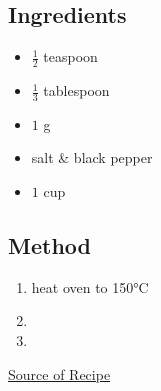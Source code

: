 \documentclass[11pt,a4paper]{article}
\begin{document}
\subsection*{Ingredients}

\begin{multicols}{2}

\begin{itemize}
  \item $ \frac{1}{2} $ teaspoon
  \item $ \frac{1}{3} $ tablespoon
  \item $ 1 $ \si{\gram}
  \item salt \& black pepper
\end{itemize}

\columnbreak

\begin{itemize}
  \item $ 1 $ cup
\end{itemize}

\end{multicols}

\medskip

\subsection*{Method}

\begin{enumerate}
  \item heat oven to 150\si{\celsius}
  \item \lipsum[2]
  \item \lipsum[3]
\end{enumerate}

\href{https://en.wikipedia.org/wiki/Recipe}{Source of Recipe}
\end{document}

